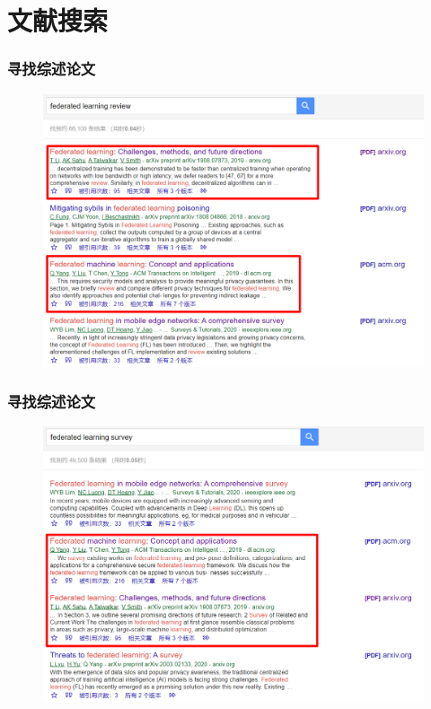 \documentclass[hyperref={pdfpagelabels=false}]{beamer}
\begin{document}
\section{文献搜索}
\begin{frame}
	\tableofcontents[currentsection]
\end{frame} 
\begin{frame}
	\frametitle{寻找综述论文}
	\begin{figure}
		\centering
		\includegraphics[height=0.8\textheight]{./figure/2.png}
	\end{figure}
\end{frame}

\begin{frame}
	\frametitle{寻找综述论文}
	\begin{figure}
		\centering
		\includegraphics[height=0.8\textheight]{./figure/3.png}
	\end{figure}
\end{frame}
\end{document}
